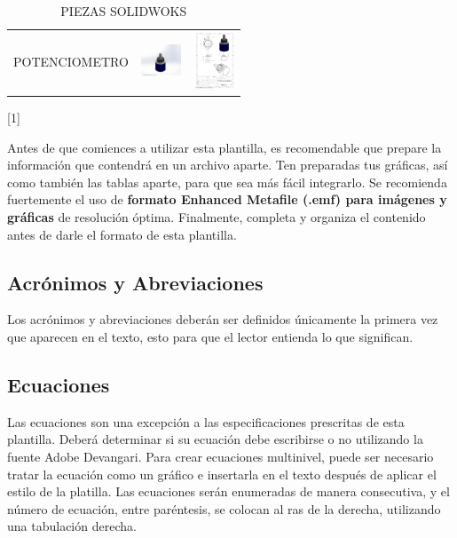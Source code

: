 \begin{table}[H]
\begin{tabular}{|c|c|c|}
        \hline
        POTENCIOMETRO & \includegraphics[width=12mm]{9/Img/PIEZAPotenciometro.pdf} & \includegraphics[width=12mm]{9/Img/PLANOPotenciometro.pdf}\\
        
    
        \end{tabular}
        \caption{PIEZAS SOLIDWOKS}
        \label{tab:my_label}
    \end{table}[1]
    
    
    Antes de que comiences a utilizar esta plantilla, es recomendable que prepare la información que contendrá en un archivo aparte. 
    Ten preparadas tus gráficas, así como también las tablas aparte, para que sea más fácil integrarlo.  
    Se recomienda fuertemente el uso de \textbf{formato Enhanced Metafile (.emf) para imágenes y gráficas} de resolución óptima. 
    Finalmente, completa y organiza el contenido antes de darle el formato de esta plantilla. 
    
    \subsection{Acrónimos y Abreviaciones}
    
    Los acrónimos y abreviaciones deberán ser definidos únicamente la primera vez que aparecen en el texto, esto para que el lector entienda lo que significan.
    
    \subsection{Ecuaciones}
    
    Las ecuaciones son una excepción a las especificaciones prescritas de esta plantilla. 
    Deberá determinar si su ecuación debe escribirse o no utilizando la fuente Adobe Devangari. 
    Para crear ecuaciones multinivel, puede ser necesario tratar la ecuación como un gráfico e insertarla en el texto después de aplicar el estilo de la platilla.
    Las ecuaciones serán enumeradas de manera consecutiva, y el número de ecuación, entre paréntesis, se colocan al ras de la derecha, utilizando una tabulación derecha. 
    
